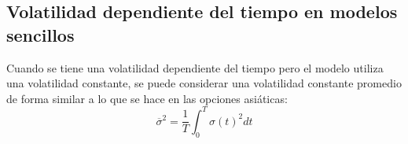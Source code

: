 \subsection{Volatilidad dependiente del tiempo en modelos sencillos}\label{sec:vol_dep_tiempo}
Cuando se tiene una volatilidad dependiente del tiempo pero el modelo utiliza una volatilidad constante, se puede considerar una volatilidad constante promedio de forma similar a lo que se hace en las opciones asiáticas:
\begin{equation*}
    \boxed{\overline{\sigma}^2 = \frac{1}{T} \int_0^T \sigma(t)^2 dt}
\end{equation*}




